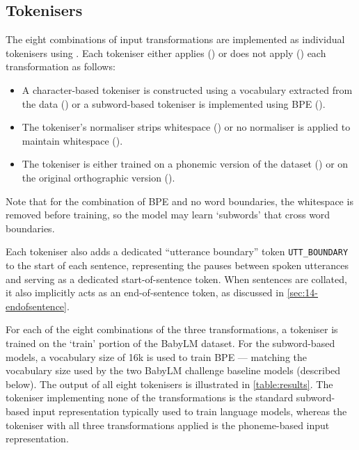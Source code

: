 \subsection{Tokenisers}\label{sec:14-tokenisers}

The eight combinations of input transformations are implemented as individual tokenisers using . Each tokeniser either applies (\cmark) or does not apply (\xmark) each transformation as follows:

\begin{itemize}
\setlength\itemsep{0.1em}
    \item {} A character-based tokeniser is constructed using a vocabulary extracted from the data (\cmark) or a subword-based tokeniser is implemented using BPE (\xmark).
    \item {} The tokeniser's normaliser strips whitespace (\cmark) or no normaliser is applied to maintain whitespace (\xmark).
    \item {} The tokeniser is either trained on a phonemic version of the dataset (\cmark) or on the original orthographic version (\xmark).
\end{itemize}

Note that for the combination of BPE and no word boundaries, the whitespace is removed before training, so the model may learn `subwords' that cross word boundaries.

Each tokeniser also adds a dedicated ``utterance boundary'' token \texttt{UTT\_BOUNDARY} to the start of each sentence, representing the pauses between spoken utterances and serving as a dedicated start-of-sentence token. When sentences are collated, it also implicitly acts as an end-of-sentence token, as discussed in \cref{sec:14-endofsentence}.

For each of the eight combinations of the three transformations, a tokeniser is trained on the `train' portion of the BabyLM dataset. For the subword-based models, a vocabulary size of 16k is used to train BPE --- matching the vocabulary size used by the two BabyLM challenge baseline models (described below). The output of all eight tokenisers is illustrated in \cref{table:results}. The tokeniser implementing none of the transformations is the standard subword-based input representation typically used to train language models, whereas the tokeniser with all three transformations applied is the phoneme-based input representation.

